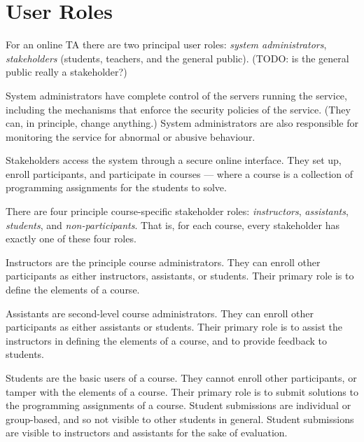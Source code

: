 
\section{User Roles}


For an online TA there are two principal user roles: \emph{system
administrators}, \emph{stakeholders} (students, teachers, and the general
public). (TODO: is the general public really a stakeholder?) 



System administrators have complete control of the servers running the service,
including the mechanisms that enforce the security policies of the service.
(They can, in principle, change anything.) System administrators are also
responsible for monitoring the service for abnormal or abusive behaviour.


Stakeholders access the system through a secure online interface. They set up,
enroll participants, and participate in courses --- where a course is a
collection of programming assignments for the students to solve.


There are four principle course-specific stakeholder roles: \emph{instructors},
\emph{assistants}, \emph{students}, and \emph{non-participants}. That is, for
each course, every stakeholder has exactly one of these four roles.

Instructors are the principle course administrators. They can enroll other
participants as either instructors, assistants, or students. Their primary role
is to define the elements of a course.

Assistants are second-level course administrators. They can enroll other
participants as either assistants or students. Their primary role is to assist
the instructors in defining the elements of a course, and to provide feedback
to students.

Students are the basic users of a course. They cannot enroll other
participants, or tamper with the elements of a course. Their primary role is to
submit solutions to the programming assignments of a course. Student
submissions are individual or group-based, and so not visible to other students
in general. Student submissions are visible to instructors and assistants for
the sake of evaluation.

